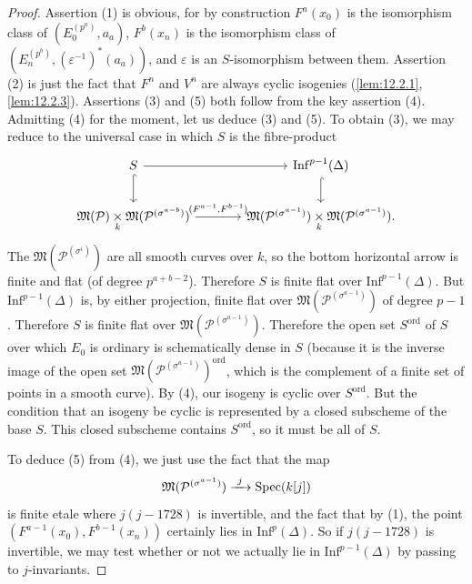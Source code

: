 \begin{proof}
Assertion (1) is obvious, for by construction $F^a(x_0)$ is the isomorphism class of $(E_0^{(p^a)}, a_a)$, $F^b(x_n)$ is the isomorphism class of $(E_n^{(p^b)}, (\varepsilon^{-1})^*(a_a))$, and $\varepsilon$ is an $S$-isomorphism between them. Assertion (2) is just the fact that $F^n$ and $V^n$ are always cyclic isogenies (\ref{lem:12.2.1}, \ref{lem:12.2.3}). Assertions (3) and (5) both follow from the key assertion (4). Admitting (4) for the moment, let us deduce (3) and (5). To obtain (3), we may reduce to the universal case in which $S$ is the fibre-product
\[
\begin{tikzcd}[row sep=2em, column sep=large]
S \arrow[r] \arrow[d, hook] & \mathrm{Inf}^{p-1}(\Delta) \arrow[d, hook] \\
\mathfrak{M}(\mathcal{P}) \fib{k} \mathfrak{M}(\mathcal{P}^{(\sigma^{a-b})}) \arrow[r, "{(F^{a-1}, F^{b-1})}"] & \mathfrak{M}(\mathcal{P}^{(\sigma^{a-1})}) \fib{k} \mathfrak{M}(\mathcal{P}^{(\sigma^{a-1})}) .
\end{tikzcd}
\]
The $\mathfrak{M}(\mathcal{P}^{(\sigma^i)})$ are all smooth curves over $k$, so the bottom horizontal arrow is finite and flat (of degree $p^{a+b-2}$). Therefore $S$ is finite flat over $\mathrm{Inf}^{p-1}(\Delta)$. But $\mathrm{Inf}^{p-1}(\Delta)$ is, by either projection, finite flat over $\mathfrak{M}(\mathcal{P}^{(\sigma^{a-1})})$ of degree $p-1$. Therefore $S$ is finite flat over $\mathfrak{M}(\mathcal{P}^{(\sigma^{a-1})})$. Therefore the open set $S^{\mathrm{ord}}$ of $S$ over which $E_0$ is ordinary is schematically dense in $S$ (because it is the inverse image of the open set $\mathfrak{M}(\mathcal{P}^{(\sigma^{a-1})})^{\mathrm{ord}}$, which is the complement of a finite set of points in a smooth curve). By (4), our isogeny is cyclic over $S^{\mathrm{ord}}$. But the condition that an isogeny be cyclic is represented by a closed subscheme of the base $S$. This closed subscheme contains $S^{\mathrm{ord}}$, so it must be all of $S$.

To deduce (5) from (4), we just use the fact that the map
\[
\mathfrak{M}(\mathcal{P}^{(\sigma^{a-1})}) \xrightarrow{\ j\ } \operatorname{Spec}(k[j])
\]
is finite etale where $j(j-1728)$ is invertible, and the fact that by (1), the point $(F^{a-1}(x_0), F^{b-1}(x_n))$ certainly lies in $\mathrm{Inf}^p(\Delta)$. So if $j(j-1728)$ is invertible, we may test whether or not we actually lie in $\mathrm{Inf}^{p-1}(\Delta)$ by passing to $j$-invariants.


\end{proof}
